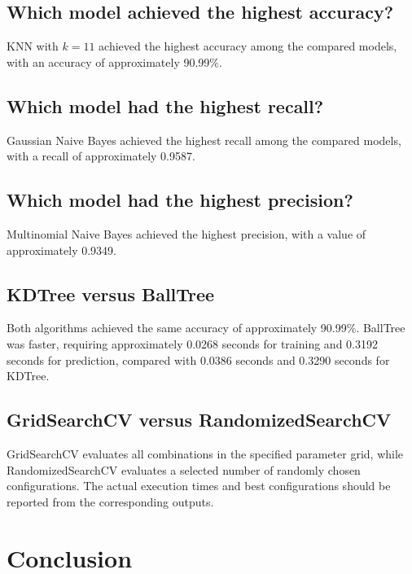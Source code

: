 \documentclass[12pt,a4paper]{article}
\begin{document}
\subsection{Which model achieved the highest accuracy?}

KNN with $k=11$ achieved the highest accuracy among the compared models, with an accuracy of approximately 90.99\%.

\subsection{Which model had the highest recall?}

Gaussian Naive Bayes achieved the highest recall among the compared models, with a recall of approximately 0.9587.

\subsection{Which model had the highest precision?}

Multinomial Naive Bayes achieved the highest precision, with a value of approximately 0.9349.

\subsection{KDTree versus BallTree}

Both algorithms achieved the same accuracy of approximately 90.99\%. BallTree was faster, requiring approximately 0.0268 seconds for training and 0.3192 seconds for prediction, compared with 0.0386 seconds and 0.3290 seconds for KDTree.

\subsection{GridSearchCV versus RandomizedSearchCV}

GridSearchCV evaluates all combinations in the specified parameter grid, while RandomizedSearchCV evaluates a selected number of randomly chosen configurations. The actual execution times and best configurations should be reported from the corresponding outputs.


\section{Conclusion}
\end{document}
